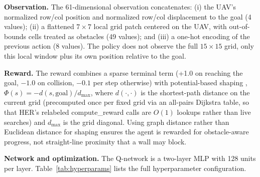 \textbf{Observation.} The 61-dimensional observation concatenates: (i) the UAV's normalized row/col position and normalized row/col displacement to the goal (4 values); (ii) a flattened $7\times7$ local grid patch centered on the UAV, with out-of-bounds cells treated as obstacles (49 values); and (iii) a one-hot encoding of the previous action (8 values). The policy does not observe the full $15\times15$ grid, only this local window plus its own position relative to the goal.

\textbf{Reward.} The reward combines a sparse terminal term (+1.0 on reaching the goal, $-1.0$ on collision, $-0.1$ per step otherwise) with potential-based shaping \cite{ng1999shaping}, $\Phi(s) = -d(s,\text{goal})/d_{\max}$, where $d(\cdot,\cdot)$ is the shortest-path distance on the current grid (precomputed once per fixed grid via an all-pairs Dijkstra table, so that HER's relabeled compute\_reward calls are $O(1)$ lookups rather than live searches) and $d_{\max}$ is the grid diagonal. Using graph distance rather than Euclidean distance for shaping ensures the agent is rewarded for obstacle-aware progress, not straight-line proximity that a wall may block.

\textbf{Network and optimization.} The Q-network is a two-layer MLP with 128 units per layer. Table~\ref{tab:hyperparams} lists the full hyperparameter configuration.

\begin{table}[h]
\centering
\caption{DQN + HER hyperparameters (identical across all curriculum phases).}
\label{tab:hyperparams}
\end{table}

